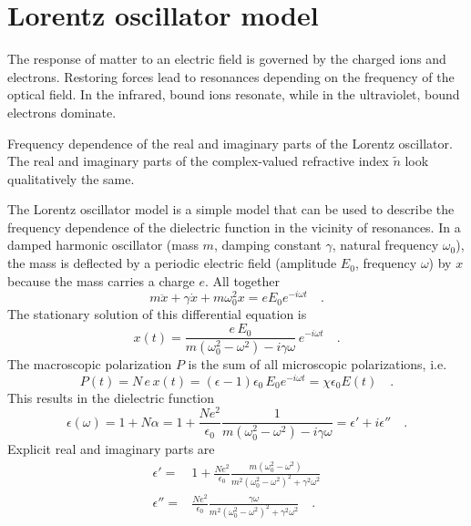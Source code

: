 \section{Lorentz oscillator model}

The response of matter to an electric field is governed by the charged ions and electrons. Restoring forces lead to resonances depending on the frequency of the optical field. In the infrared, bound ions resonate, while in the ultraviolet, bound electrons dominate.


\begin{marginfigure}

\caption{Frequency dependence of the real and imaginary parts of the Lorentz oscillator. The real and imaginary parts of the complex-valued refractive index $\tilde{n}$ look qualitatively the same. \label{fig:4_lorentz}}
\end{marginfigure}

The Lorentz oscillator model is a simple model that can be used to describe the frequency dependence of the dielectric function in the vicinity of resonances. In a damped harmonic oscillator (mass $m$, damping constant $\gamma$, natural frequency $\omega_0$), the mass is deflected by a periodic electric field (amplitude $E_0$, frequency $\omega$) by $x$ because the mass carries a charge $e$. All together
\begin{equation}
 m \ddot{x} + \gamma \dot{x} + m \omega_0^2 x = e E_0 e^{- i \omega t} \quad .
\end{equation}
The stationary solution of this differential equation is
\begin{equation}
 x(t) = \frac{e \, E_0}{m (\omega_0^2 - \omega^2) - i \gamma \omega} \, e^{- i \omega t} \quad .
\end{equation}
The macroscopic polarization $P$ is the sum of all microscopic polarizations, i.e.
\begin{equation}
P(t) = N \, e \,x(t) = (\epsilon -1 ) \epsilon_0 \, E_0 e^{- i \omega t}
= \chi \epsilon_0 E(t) \quad .
\end{equation}
This results in the dielectric function
\begin{equation}
\epsilon(\omega) = 1 + N \alpha = 1 +\frac{N e^2}{\epsilon_0} \frac{1}{m (\omega_0^2 - \omega^2) - i \gamma \omega} = \epsilon' + i \epsilon'' \quad .
\end{equation}
Explicit real and imaginary parts are
\begin{align}
 \epsilon' = & 1 + \frac{N e^2}{\epsilon_0} \frac{ m (\omega_0^2 - \omega^2)}{m^2 (\omega_0^2 - \omega^2)^2 + \gamma^2 \omega^2}  \\
  \epsilon'' = & \frac{N e^2}{\epsilon_0} \frac{ \gamma \omega }{m^2 (\omega_0^2 - \omega^2)^2 + \gamma^2 \omega^2}  \quad .
\end{align}


